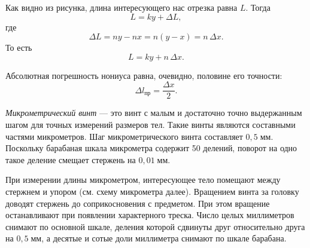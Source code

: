 Как видно из рисунка, длина интересующего нас отрезка равна $L$. Тогда
\[
L=ky+\Delta L,
\]
где
\[
\Delta L=ny-nx=n(y-x)=n\,\Delta x.
\]
То есть
\[
L=ky+n\,\Delta x.
\]

Абсолютная погрешность нониуса равна, очевидно, половине его точности:
\[
\Delta l_\text{пр}=\frac{\Delta x}{2}.
\]

\textit{Микрометрический винт} --- это винт с малым и достаточно точно выдержанным шагом для точных измерений размеров тел. Такие винты являются составными частями микрометров. Шаг микрометрического винта составляет $0{,}5\;\text{мм}$. Поскольку барабаная шкала микрометра содержит 50 делений, поворот на одно такое деление смещает стержень на $0{,}01\;\text{мм}$.

При измерении длины микрометром, интересующее тело помещают между стержнем и упором (см. схему микрометра далее). Вращением винта за головку доводят стержень до соприкосновения с предметом. При этом вращение останавливают при появлении характерного треска. Число целых миллиметров снимают по основной шкале, деления которой сдвинуты друг относительно друга на $0{,}5\;\text{мм}$, а десятые и сотые доли миллиметра снимают по шкале барабана.